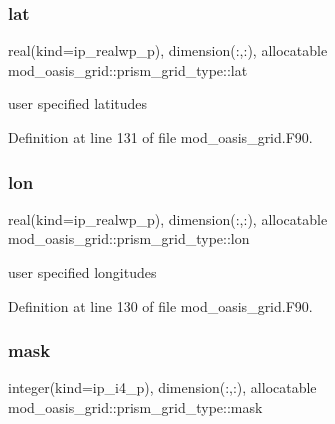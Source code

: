 \subsubsection{\texorpdfstring{lat}{lat}}
{\footnotesize\ttfamily real(kind=ip\+\_\+realwp\+\_\+p), dimension(\+:,\+:), allocatable mod\+\_\+oasis\+\_\+grid\+::prism\+\_\+grid\+\_\+type\+::lat\hspace{0.3cm}{\ttfamily [private]}}



user specified latitudes 



Definition at line 131 of file mod\+\_\+oasis\+\_\+grid.\+F90.

\mbox{\label{structmod__oasis__grid_1_1prism__grid__type_a4f7fb8a71335506209709cfbe939ef7b}} 
\subsubsection{\texorpdfstring{lon}{lon}}
{\footnotesize\ttfamily real(kind=ip\+\_\+realwp\+\_\+p), dimension(\+:,\+:), allocatable mod\+\_\+oasis\+\_\+grid\+::prism\+\_\+grid\+\_\+type\+::lon\hspace{0.3cm}{\ttfamily [private]}}



user specified longitudes 



Definition at line 130 of file mod\+\_\+oasis\+\_\+grid.\+F90.

\mbox{\label{structmod__oasis__grid_1_1prism__grid__type_ae50e83035d6214d862be48a5060887ae}} 
\subsubsection{\texorpdfstring{mask}{mask}}
{\footnotesize\ttfamily integer(kind=ip\+\_\+i4\+\_\+p), dimension(\+:,\+:), allocatable mod\+\_\+oasis\+\_\+grid\+::prism\+\_\+grid\+\_\+type\+::mask\hspace{0.3cm}{\ttfamily [private]}}



